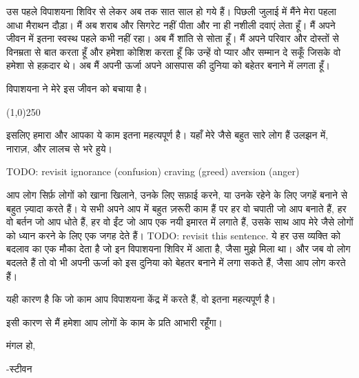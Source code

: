 \documentclass{article}
\begin{document}
उस पहले विपाशयना शिविर से लेकर अब तक सात साल हो गये हैं। पिछली जुलाई में मैंने मेरा पहला आधा मैराथन
दौड़ा। मैं अब शराब और सिगरेट नहीं पीता और ना ही नशीली दवाएं लेता हूँ। मैं अपने जीवन में इतना स्वस्थ पहले
कभी नहीं रहा। अब मैं शांति से सोता हूँ। मैं अपने परिवार और दोस्तों से विनम्रता से बात करता हूँ और हमेशा
कोशिश करता हूँ कि उन्हें वो प्यार और सम्मान दे सकूँ जिसके वो हमेशा से हक़दार थे। अब मैं अपनी ऊर्जा अपने
आसपास की दुनिया को बहेतर बनाने में लगता हूँ।

विपाशयना ने मेरे इस जीवन को बचाया है।

\begin{center}
\line(1,0){250}
\end{center}

इसलिए हमारा और आपका ये काम इतना महत्यपूर्ण है। यहाँ मेरे जैसे बहुत सारे लोग हैं \textemdash उलझन में, नाराज़, और लालच से भरे हुये।

TODO: revisit
ignorance (confusion)
craving (greed)
aversion (anger)

आप लोग सिर्फ़ लोगों को खाना खिलाने, उनके लिए सफ़ाई करने, या उनके रहेने के लिए जगहें बनाने से बहुत
ज़्यादा करते हैं। ये सभी अपने आप में बहुत ज़रूरी काम हैं पर हर वो चपाती जो आप बनाते हैं, हर वो बर्तन जो आप धोते हैं, हर वो ईंट जो आप एक नयी इमारत में लगाते हैं, उसके साथ आप मेरे जैसे लोगों को ध्यान करने के लिए एक जगह देते हैं। TODO: revisit this sentence.
ये हर उस व्यक्ति को बदलाव का एक मौका देता है जो इन विपाशयना शिविर में
आता है, जैसा मुझे मिला था। और जब वो लोग बदलते हैं तो वो भी अपनी ऊर्जा को इस दुनिया को बेहतर
बनाने में लगा सकते हैं, जैसा आप लोग करते हैं।

यही कारण है कि जो काम आप विपाशयना केंद्र में करते हैं, वो इतना महत्यपूर्ण है।

इसी कारण से मैं हमेशा आप लोगों के काम के प्रति आभारी रहूँगा।

मंगल हो,

-स्टीवन
\end{document}
